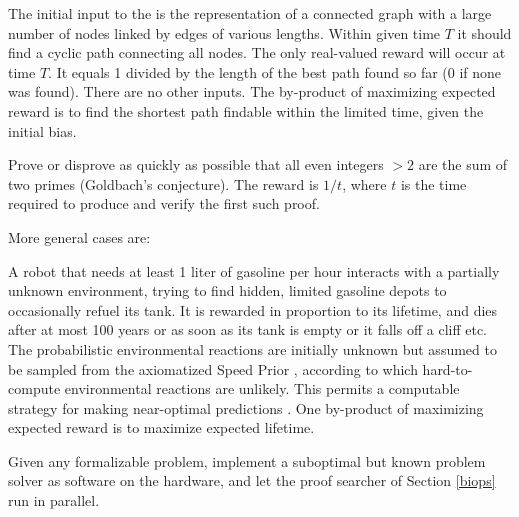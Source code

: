 \begin{example}
\label{tsp}
The initial
input to the \gm is the representation of
a connected graph with
a large number of nodes linked by
edges of various lengths.
Within given time $T$ it should
find a cyclic path connecting all nodes.
The only real-valued reward will occur
at time $T$. It equals
1 divided by the length
of the best path found so far (0 if none was found).
There are no other inputs.
The by-product of  maximizing
expected reward is to find the shortest
path findable within the limited time,
given the initial bias.
\end{example}
 
 \begin{example}
 \label{goldbach}
 Prove or disprove as quickly as possible
 that all even integers  $>2$ are the sum of
 two primes (Goldbach's conjecture).
 The reward is $1/t$,
 where $t$ is the time required to produce
 and verify the first such proof.
 \end{example}
More general cases are:

\begin{example}
\label{robot}
A robot that needs at least
1 liter of gasoline per hour
interacts with a partially unknown environment,
trying to find hidden, limited gasoline depots
to occasionally refuel its tank.
It is rewarded in proportion to its lifetime,
and dies after at most 100 years or as
soon as its tank is empty or
it falls off a cliff etc.
The probabilistic environmental reactions are initially
unknown but assumed to be sampled from
the axiomatized Speed Prior \cite{Schmidhuber:02colt},
according to which
hard-to-compute environmental reactions are unlikely.
This permits a computable strategy for making near-optimal
predictions  \cite{Schmidhuber:02colt}.
One by-product of maximizing  expected reward
is to maximize expected lifetime.
\end{example}
\begin{example}
\label{optimize}
Given any formalizable problem, implement
a suboptimal but known problem solver
as software on the \gm hardware,
and let the proof searcher of Section \ref{biops} run in parallel.
\end{example}

